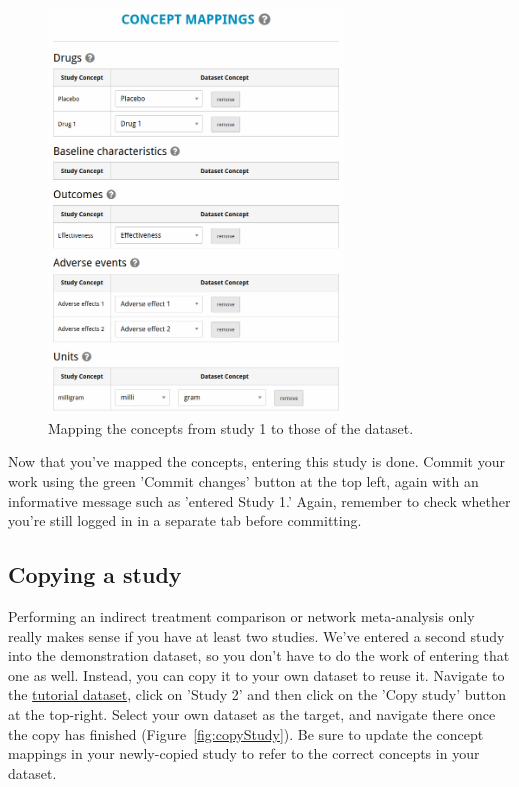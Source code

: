 \documentclass[12pt]{article}
\begin{document}
\begin{figure}[!ht]
  \centering
  \includegraphics[width=0.7\textwidth]{img/conceptMappings.png}
  \caption{Mapping the concepts from study 1 to those of the dataset.}
\label{fig:conceptMappings}
\end{figure}

Now that you've mapped the concepts, entering this study is done.
Commit your work using the green 'Commit changes' button at the top left, again with an informative message such as 'entered Study 1.' Again, remember to check whether you're still logged in in a separate tab before committing.

\subsection{Copying a study}

Performing an indirect treatment comparison or network meta-analysis only really makes sense if you have at least two studies.
We've entered a second study into the demonstration dataset, so you don't have to do the work of entering that one as well.
Instead, you can copy it to your own dataset to reuse it.
Navigate to the \href{https://addis.drugis.org/#/users/12/datasets/c190e953-051c-4cf5-ac10-332984a14a43}{tutorial dataset}, click on 'Study 2' and then click on the 'Copy study' button at the top-right.
Select your own dataset as the target, and navigate there once the copy has finished (Figure~\ref{fig:copyStudy}).
Be sure to update the concept mappings in your newly-copied study to refer to the correct concepts in your dataset.
\end{document}
